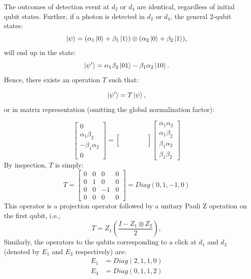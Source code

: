 \documentclass[letterpaper,10pt]{article}
\begin{document}
The outcomes of detection event at $d_2$ or $d_4$ are identical, regardless of initial qubit states. Further, if a photon is detected in $d_2$ or $d_4$, the general 2-qubit states:
\begin{equation*}
	\Ket{\psi} = (\alpha_1\Ket{0}+\beta_1\Ket{1})\otimes(\alpha_2\Ket{0}+		\beta_2\Ket{1}),
\end{equation*}
will end up in the state:
\begin{equation*}
	\Ket{\psi'} = \alpha_1\beta_2\Ket{01}-\beta_1\alpha_2\Ket{10}.
\end{equation*}
Hence, there exists an operation $T$ such that: 

\begin{equation*}
	\Ket{\psi'}=T\Ket{\psi},
\end{equation*}
or in matrix representation (omitting the global normalization factor):

\begin{equation*}
	\begin{bmatrix}
		0\\ \alpha_1\beta_2 \\ -\beta_1\alpha_2 \\ 0
	\end{bmatrix} = 
	\begin{bmatrix}
		& & & &\\ & & & & \\ & & & & \\ & & & &
	\end{bmatrix}
	\begin{bmatrix}
		\alpha_1\alpha_2\\ \alpha_1\beta_2 \\ \beta_1\alpha_2 \\ \beta_1\beta_2
	\end{bmatrix} 	
\end{equation*}
By inspection, $T$ is simply:
\begin{equation} \label{eq:T}	
	T=
	\begin{bmatrix}
		0 &0 &0 &0\\ 0&1 &0 &0 \\ 0& 0& -1 &0 \\ 0&0 &0 &0
	\end{bmatrix}=
	Diag(0,1,-1,0)
\end{equation}
This operator is a projection operator followed by a unitary Pauli Z operation on the first qubit, i.e., 
\begin{equation} \label{eq:T_Pauli}
	T=Z_1(\frac{I-Z_1\otimes Z_2}{2}), 
\end{equation}
Similarly, the operators to the qubits corresponding to a click at $d_1$ and $d_3$ (denoted by $E_1$ and $E_3$ respectively) are:
\begin{align}
	\label{eq:E1}
	E_1 &= Diag(2,1,1,0)\\
	\label{eq:E3}
	E_3&= Diag(0,1,1,2)
\end{align}
\end{document}
